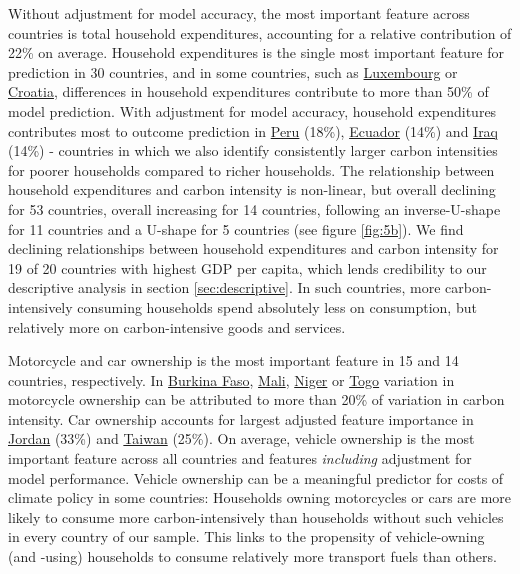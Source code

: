 \documentclass[12pt, a4paper]{article}
\begin{document}
Without adjustment for model accuracy, the most important feature across countries is total household expenditures, accounting for a relative contribution of 22\% on average. Household expenditures is the single most important feature for prediction in 30 countries, and in some countries, such as \hyperref[fig:5b_LUX]{Luxembourg} or \hyperref[fig:5b_HRV]{Croatia}, differences in household expenditures contribute to more than 50\% of model prediction. With adjustment for model accuracy, household expenditures contributes most to outcome prediction in \hyperref[fig:5b_PER]{Peru} (18\%), \hyperref[fig:5b_ECU]{Ecuador} (14\%) and \hyperref[fig:5b_IRQ]{Iraq} (14\%) - countries in which we also identify consistently larger carbon intensities for poorer households compared to richer households. The relationship between household expenditures and carbon intensity is non-linear, but overall declining for 53 countries, overall increasing for 14 countries, following an inverse-U-shape for 11 countries and a U-shape for 5 countries (see figure \ref{fig:5b}). We find declining relationships between household expenditures and carbon intensity for 19 of 20 countries with highest GDP per capita, which lends credibility to our descriptive analysis in section \ref{sec:descriptive}. In such countries, more carbon-intensively consuming households spend absolutely less on consumption, but relatively more on carbon-intensive goods and services.

Motorcycle and car ownership is the most important feature in 15 and 14 countries, respectively. In \hyperref[fig:5b_BFA]{Burkina Faso}, \hyperref[fig:5b_MLI]{Mali}, \hyperref[fig:5b_NER]{Niger} or \hyperref[fig:5b_TGO]{Togo} variation in motorcycle ownership can be attributed to more than 20\% of variation in carbon intensity. Car ownership accounts for largest adjusted feature importance in \hyperref[fig:5b_JOR]{Jordan} (33\%) and \hyperref[fig:5b_TWN]{Taiwan} (25\%). On average, vehicle ownership is the most important feature across all countries and features \textit{including} adjustment for model performance. Vehicle ownership can be a meaningful predictor for costs of climate policy in some countries: Households owning motorcycles or cars are more likely to consume more carbon-intensively than households without such vehicles in every country of our sample. This links to the propensity of vehicle-owning (and -using) households to consume relatively more transport fuels than others.
\end{document}
